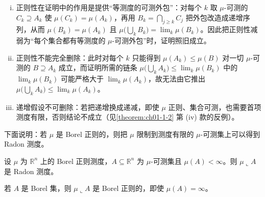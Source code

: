 \documentclass[../../main.tex]{subfiles}
\begin{document}
\begin{remark}\label{remark:ch01-thm-1-6-条件}
\begin{enumerate}[(i)]
\item 正则性在证明中的作用是提供“等测度的可测外包”：对每个 $k$ 取 $\mu$-可测的 $C_{k}\supseteq A_{k}$ 使 $\mu(C_{k})=\mu(A_{k})$，再用 $B_{k}=\bigcap_{j\geqslant k}C_{j}$ 把外包改造成递增序列，从而 $\mu(B_{k})=\mu(A_{k})$ 且 $\mu\bigl(\bigcup_{k}B_{k}\bigr)=\lim_{k}\mu(B_{k})$。因此把正则性减弱为“每个集合都有等测度的 $\mu$-可测外包”时，证明照旧成立。
\item 正则性不能完全删除：此时对每个 $k$ 只能得到 $\mu(A_{k})\leqslant\mu(B)$ 对一切 $\mu$-可测的 $B\supseteq A_{k}$ 成立，而证明所需的链条 $\mu\bigl(\bigcup_{k}A_{k}\bigr)\leqslant\lim_{k}\mu(B_{k})$ 中的 $\lim_{k}\mu(B_{k})$ 可能严格大于 $\lim_{k}\mu(A_{k})$，故无法由它推出 $\mu\bigl(\bigcup_{k}A_{k}\bigr)\leqslant\lim_{k}\mu(A_{k})$。
\item 递增假设不可删除：若把递增换成递减，即使 $\mu$ 正则、集合可测，也需要首项测度有限，否则结论不成立（见\cref{theorem:ch01-1-2} 第 (iv) 款的反例）。%
\end{enumerate}
\end{remark}

下面说明：若 $\mu$ 是 Borel 正则的，则把 $\mu$ 限制到测度有限的 $\mu$-可测集上可以得到 Radon 测度。

\begin{theorem}\label{theorem:ch01-1-7}
设 $\mu$ 为 $\mathbb{R}^{n}$ 上的 Borel 正则测度，$A\subseteq\mathbb{R}^{n}$ 为 $\mu$-可测集且 $\mu(A)<\infty$。则 $\mu\llcorner A$ 是 Radon 测度。
\end{theorem}

\begin{remark}\label{remark:ch01-thm-1-7-例子}
若 $A$ 是 Borel 集，则 $\mu\llcorner A$ 是 Borel 正则的，即使 $\mu(A)=\infty$。
\end{remark}
\end{document}

